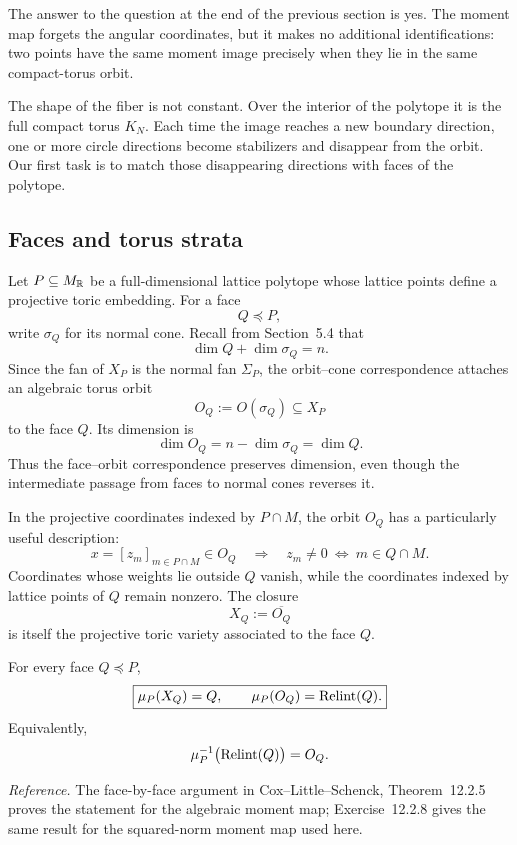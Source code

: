 The answer to the question at the end of the previous section is yes.
The moment map forgets the angular coordinates, but it makes no
additional identifications: two points have the same moment image
precisely when they lie in the same compact-torus orbit.

The shape of the fiber is not constant. Over the interior of the
polytope it is the full compact torus \(K_N\). Each time the image
reaches a new boundary direction, one or more circle directions become
stabilizers and disappear from the orbit. Our first task is to match
those disappearing directions with faces of the polytope.

\subsection{Faces and torus strata}

Let \(P\subseteq M_{\mathbb{R}}\) be a full-dimensional lattice polytope whose
lattice points define a projective toric embedding. For a face
\[
Q\preceq P,
\]
write \(\sigma_Q\) for its normal cone. Recall from Section~5.4 that
\[
\dim Q+\dim\sigma_Q=n.
\]
Since the fan of \(X_P\) is the normal fan \(\Sigma_P\), the
orbit--cone correspondence attaches an algebraic torus orbit
\[
O_Q:=O(\sigma_Q)\subseteq X_P
\]
to the face \(Q\). Its dimension is
\[
\dim O_Q
=n-\dim\sigma_Q
=\dim Q.
\]
Thus the face--orbit correspondence preserves dimension, even though
the intermediate passage from faces to normal cones reverses it.

In the projective coordinates indexed by \(P\cap M\), the orbit
\(O_Q\) has a particularly useful description:
\[
x=[z_m]_{m\in P\cap M}\in O_Q
\quad\Longrightarrow\quad
z_m\neq0
\ \Longleftrightarrow\ 
m\in Q\cap M.
\]
Coordinates whose weights lie outside \(Q\) vanish, while the
coordinates indexed by lattice points of \(Q\) remain nonzero. The
closure
\[
X_Q:=\overline{O_Q}
\]
is itself the projective toric variety associated to the face \(Q\).

\begin{proposition}
\label{prop:moment-map-respects-face-strata}
For every face \(Q\preceq P\),
\[
\boxed{
\mu_P(X_Q)=Q,
\qquad
\mu_P(O_Q)=\operatorname{Relint}(Q).
}
\]
Equivalently,
\[
\mu_P^{-1}\bigl(\operatorname{Relint}(Q)\bigr)=O_Q.
\]
\end{proposition}

\noindent
\textit{Reference.}
The face-by-face argument in Cox--Little--Schenck,
Theorem~12.2.5 proves the statement for the algebraic moment map;
Exercise~12.2.8 gives the same result for the squared-norm moment map
used here.


